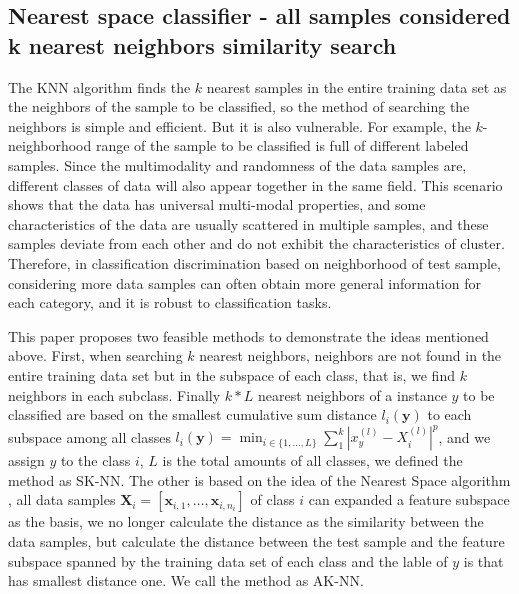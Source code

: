 \documentclass{ieeeaccess}
\begin{document}
\subsection{Nearest space classifier - all samples considered k nearest neighbors similarity search}
The KNN algorithm finds the $k$ nearest samples in the entire training data set as the neighbors of the sample to be classified, so the method of searching the neighbors is simple and efficient. But it is also vulnerable. For example, the $k$-neighborhood range of the sample to be classified is full of different labeled samples. Since the multimodality and randomness of the data samples are, different classes of data will also appear together in the same field.
This scenario shows that the data has universal multi-modal properties, and some characteristics of the data are usually scattered in multiple samples, and these samples deviate from each other and do not exhibit the characteristics of cluster. Therefore, in classification discrimination based on neighborhood of test sample, considering more data samples can often obtain more general information for each category, and it is robust to classification tasks.

This paper proposes two feasible methods to demonstrate the ideas mentioned above. 
First, when searching $k$ nearest neighbors, neighbors are not found in the entire training data set but in the subspace of each class, that is, we find $k$ neighbors in each subclass. Finally $k*L$ nearest neighbors of a instance $y$ to be classified are based on the smallest cumulative sum distance $l_{i}(\boldsymbol{y})$ to each subspace among all classes $l_{i}(\boldsymbol{y})=\min_{i \in \{1,\dots,L\}}\sum_{1}^{k}\left|x_{y}^{(l)}-X_{i}^{(l)}\right|^{p}$, and we assign $y$ to the class $i$, $L$ is the total amounts of all classes, we defined the method as SK-NN.
The other is based on the idea of the Nearest Space algorithm \cite{liu2011k}, all data samples $\boldsymbol{X}_{i}=\left[\boldsymbol{x}_{i, 1}, \ldots, \boldsymbol{x}_{i, n_{i}}\right]$ of class $i$ can expanded a feature subspace as the basis, we no longer calculate the distance as the similarity between the data samples, but calculate the distance between the test sample and the feature subspace spanned by the training data set of each class and the lable of $y$ is that has smallest distance one. We call the method as AK-NN. 
\end{document}
